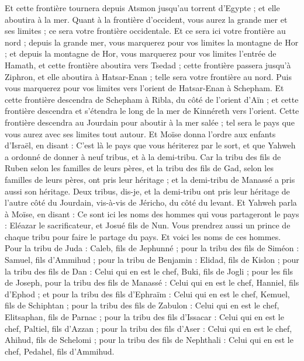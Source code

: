 \begin{multicols}{2}
Et cette frontière tournera depuis Atsmon jusqu'au torrent d'Egypte ; et elle aboutira à la mer.
Quant à la frontière d'occident, vous aurez la grande mer et ses limites ; ce sera votre frontière occidentale.
Et ce sera ici votre frontière au nord ; depuis la grande mer, vous marquerez pour vos limites la montagne de Hor ;
et depuis la montagne de Hor, vous marquerez pour vos limites l’entrée de Hamath, et cette frontière aboutira vers Tsedad ;
cette frontière passera jusqu’à Ziphron, et elle aboutira à Hatsar-Enan ; telle sera votre frontière au nord.
Puis vous marquerez pour vos limites vers l'orient de Hatsar-Enan à Schepham.
Et cette frontière descendra de Schepham à Ribla, du côté de l'orient d'Aïn ; et cette frontière descendra et s'étendra le long de la mer de Kinnéreth vers l'orient.
Cette frontière descendra au Jourdain pour aboutir à la mer salée ; tel sera le pays que vous aurez avec ses limites tout autour.
Et Moïse donna l'ordre aux enfants d'Israël, en disant : C'est là le pays que vous hériterez par le sort, et que Yahweh a ordonné de donner à neuf tribus, et à la demi-tribu.
Car la tribu des fils de Ruben selon les familles de leurs pères, et la tribu des fils de Gad, selon les familles de leurs pères, ont pris leur héritage ; et la demi-tribu de Manassé a pris aussi son héritage.
Deux tribus, dis-je, et la demi-tribu ont pris leur héritage de l'autre côté du Jourdain, vis-à-vis de Jéricho, du côté du levant.
Et Yahweh parla à Moïse, en disant :
Ce sont ici les noms des hommes qui vous partageront le pays : Eléazar le sacrificateur, et Josué fils de Nun.
Vous prendrez aussi un prince de chaque tribu pour faire le partage du pays.
Et voici les noms de ces hommes. Pour la tribu de Juda : Caleb, fils de Jephunné ;
pour la tribu des fils de Siméon : Samuel, fils d'Ammihud ;
pour la tribu de Benjamin : Elidad, fils de Kislon ;
pour la tribu des fils de Dan : Celui qui en est le chef, Buki, fils de Jogli ;
pour les fils de Joseph, pour la tribu des fils de Manassé : Celui qui en est le chef, Hanniel, fils d'Ephod ;
et pour la tribu des fils d'Ephraïm : Celui qui en est le chef, Kemuel, fils de Schiphtan ;
pour la tribu des fils de Zabulon : Celui qui en est le chef, Elitsaphan, fils de Parnac ;
pour la tribu des fils d'Issacar : Celui qui en est le chef, Paltiel, fils d'Azzan ;
pour la tribu des fils d'Aser : Celui qui en est le chef, Ahihud, fils de Schelomi ;
pour la tribu des fils de Nephthali : Celui qui en est le chef, Pedahel, fils d'Ammihud.

\end{multicols}
